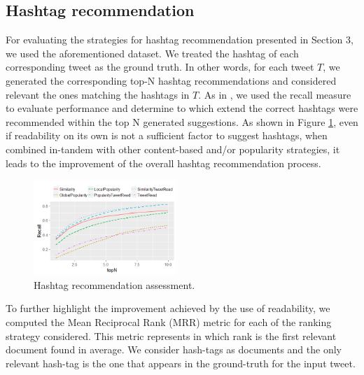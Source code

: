 \documentclass{sig-alternate-05-2015}
\begin{document}
\subsection{Hashtag recommendation} For evaluating the strategies for hashtag recommendation presented in Section 3, we used the aforementioned dataset. We treated the hashtag of each corresponding tweet as the ground truth. In other words, for each tweet $T$, we generated the corresponding top-N hashtag recommendations and considered relevant the ones matching the hashtags in $T$. As in \cite{hashtagRec}, we used the recall measure to evaluate performance and determine to which  extend the correct hashtags were recommended within the top N generated suggestions.
As shown in Figure \ref{fig:comparison}, even if readability on its own is not a sufficient factor to suggest hashtags, when combined in-tandem with other content-based and/or popularity strategies, it leads to the improvement of the overall hashtag recommendation process. %
\begin{figure}[h]

\centering
\includegraphics[width=0.48\textwidth]{comparison}
\caption{Hashtag recommendation assessment.}
\label{fig:comparison}
\vspace{-0.5cm}
\end{figure}


To further highlight the improvement achieved by the use of readability, we computed the Mean Reciprocal Rank (MRR) metric for each of the ranking strategy considered. This metric represents in which rank is the first relevant document found in average. We consider hash-tags as documents and the only relevant hash-tag is the one that appears in the ground-truth for the input tweet.
\end{document}
